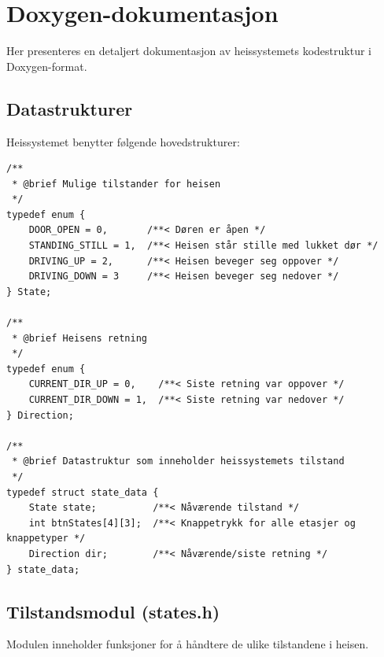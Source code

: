 \section{Doxygen-dokumentasjon}
Her presenteres en detaljert dokumentasjon av heissystemets kodestruktur i Doxygen-format.

\subsection{Datastrukturer}
Heissystemet benytter følgende hovedstrukturer:

\begin{lstlisting}[style=cpp, caption=Heissystemets tilstander]
/**
 * @brief Mulige tilstander for heisen
 */
typedef enum { 
    DOOR_OPEN = 0,       /**< Døren er åpen */
    STANDING_STILL = 1,  /**< Heisen står stille med lukket dør */
    DRIVING_UP = 2,      /**< Heisen beveger seg oppover */
    DRIVING_DOWN = 3     /**< Heisen beveger seg nedover */
} State;

/**
 * @brief Heisens retning
 */
typedef enum { 
    CURRENT_DIR_UP = 0,    /**< Siste retning var oppover */
    CURRENT_DIR_DOWN = 1,  /**< Siste retning var nedover */
} Direction;

/**
 * @brief Datastruktur som inneholder heissystemets tilstand
 */
typedef struct state_data {
    State state;          /**< Nåværende tilstand */
    int btnStates[4][3];  /**< Knappetrykk for alle etasjer og knappetyper */
    Direction dir;        /**< Nåværende/siste retning */
} state_data;
\end{lstlisting}

\subsection{Tilstandsmodul (states.h)}
Modulen inneholder funksjoner for å håndtere de ulike tilstandene i heisen.

